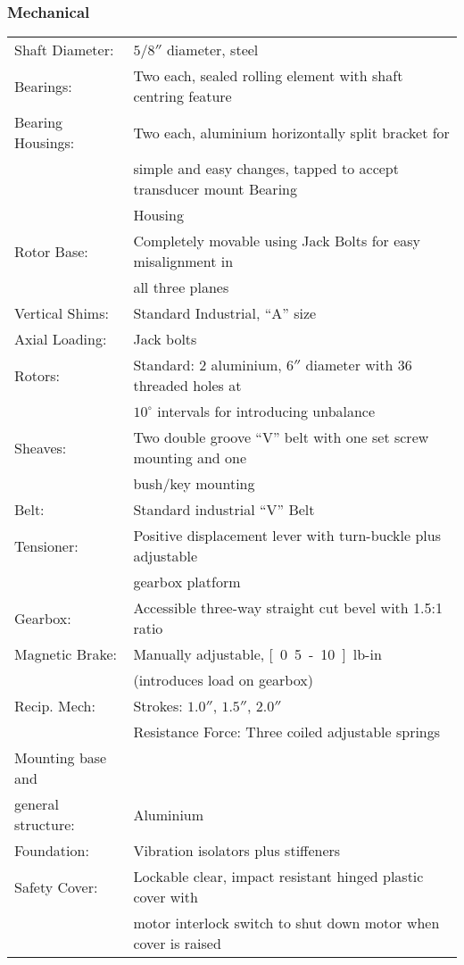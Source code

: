 \documentclass[a4paper,11pt]{report}
\begin{document}
\subsubsection{Mechanical} \label{mechspec}
\begin{tabular}{ll}
Shaft Diameter: &  $5/8''$ diameter, steel\\
Bearings: &  Two each, sealed rolling element with shaft centring feature\\
Bearing Housings: &  Two each, aluminium horizontally split bracket for \\
	& simple and easy changes, tapped to accept transducer mount Bearing \\
	& Housing\\
Rotor Base: & Completely movable using Jack Bolts for easy misalignment in \\
 & all three planes\\
Vertical Shims: &  Standard Industrial, ``A'' size\\
Axial Loading: &  Jack bolts\\
Rotors: & Standard: 2 aluminium, $6''$ diameter with 36 threaded holes at \\
	& $10^{\circ}$ intervals for introducing unbalance\\
Sheaves: &  Two double groove ``V'' belt with one set screw mounting and one \\
       & bush/key mounting\\
Belt: &  Standard industrial ``V'' Belt\\
Tensioner: & Positive displacement lever with turn-buckle plus adjustable \\
	& gearbox platform\\
Gearbox: &  Accessible three-way straight cut bevel with 1.5:1 ratio\\
Magnetic Brake: & Manually adjustable, \unit[0.5-10]{lb-in} \\
	 & (introduces load on gearbox)\\
Recip. Mech: & Strokes: $1.0''$, $1.5''$, $2.0''$ \\
	& Resistance Force: Three coiled adjustable springs\\
Mounting base and & \\
general structure: &  Aluminium\\
Foundation: &  Vibration isolators plus stiffeners\\
Safety Cover: &  Lockable clear, impact resistant hinged plastic cover with \\
       & motor interlock switch to shut down motor when cover is raised\\
\end{tabular}
\end{document}
